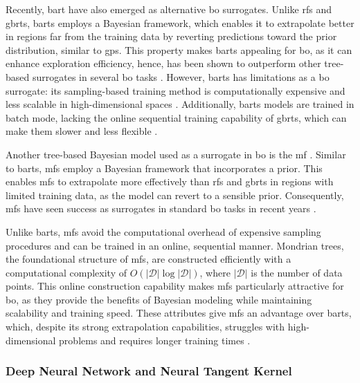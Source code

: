 Recently, \ac{bart} have also emerged as alternative \ac{bo} surrogates. Unlike \acp{rf} and \acp{gbrt}, \acp{bart} employs a Bayesian framework, which enables it to extrapolate better in regions far from the training data by reverting predictions toward the prior distribution, similar to \acp{gp}. This property makes \acp{bart} appealing for \ac{bo}, as it can enhance exploration efficiency, hence, has been shown to outperform other tree-based surrogates in several \ac{bo} tasks \citep{lei2021bayesian}. However, \acp{bart} has limitations as a \ac{bo} surrogate: its sampling-based training method is computationally expensive and less scalable in high-dimensional spaces \citep{scillitoe2021uncertainty}. Additionally, \acp{bart} models are trained in batch mode, lacking the online sequential training capability of \acp{gbrt}, which can make them slower and less flexible \citep{kim2022uncertainty}.


Another tree-based Bayesian model used as a surrogate in \ac{bo} is the \ac{mf} \citep{lakshminarayanan2014mondrian}. Similar to \acp{bart}, \acp{mf} employ a Bayesian framework that incorporates a prior. This enables \acp{mf} to extrapolate more effectively than \acp{rf} and \acp{gbrt} in regions with limited training data, as the model can revert to a sensible prior. Consequently, \acp{mf} have seen success as surrogates in standard \ac{bo} tasks in recent years \citep{scillitoe2021uncertainty}. 

Unlike \acp{bart}, \acp{mf} avoid the computational overhead of expensive sampling procedures and can be trained in an online, sequential manner. Mondrian trees, the foundational structure of \acp{mf}, are constructed efficiently with a computational complexity of \(O(\lvert \mathcal{D} \rvert \log \lvert \mathcal{D} \rvert)\), where \(\lvert \mathcal{D} \rvert\) is the number of data points. This online construction capability makes \acp{mf} particularly attractive for \ac{bo}, as they provide the benefits of Bayesian modeling while maintaining scalability and training speed. These attributes give \acp{mf} an advantage over \acp{bart}, which, despite its strong extrapolation capabilities, struggles with high-dimensional problems and requires longer training times \citep{kim2022uncertainty}. 

\subsubsection{Deep Neural Network and Neural Tangent Kernel}
\label{section:NTK}

